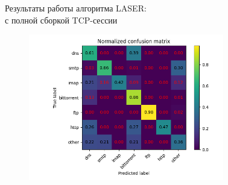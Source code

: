 \documentclass[10pt]{beamer}
\begin{document}
\begin{frame}{Результаты работы алгоритма LASER: \\ с полной сборкой TCP-сессии}
    \begin{figure}
        \begin{adjustwidth}{-2em}{-2em}
            \centering
            \includegraphics[width=23em]{results/lcs/Normalized_confusion_matrix.png}
        \end{adjustwidth}
    \end{figure}
\end{frame}
\end{document}
